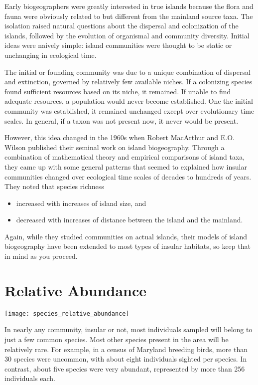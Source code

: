 \documentclass[letterpaper]{tufte-handout}
\begin{document}
Early biogeographers were greatly interested in true islands because the flora and fauna were obviously related to but different from the mainland source taxa. The isolation raised natural questions about the dispersal and colonization of the islands, followed by the evolution of organismal and community diversity. Initial ideas were naively simple: island communities were thought to be static or unchanging in ecological time.  

The initial or founding community was due to a unique combination of dispersal and extinction, governed by relatively few available niches. If a colonizing species found sufficient resources based on its niche, it remained.  If unable to find adequate resources, a population would never become established. One the initial community was established, it remained unchanged except over evolutionary time scales.  In general, if a taxon was not present now, it never would be present.  

However, this idea changed in the 1960s when Robert MacArthur and E.O. Wilson published their seminal work on island biogeography. Through a combination of mathematical theory and empirical comparisons of island taxa, they came up with some general patterns that seemed to explained how insular communities changed over ecological time scales of decades to hundreds of years. They noted that species richness 
\begin{itemize}
	\item increased with increases of island size, and
	\item decreased with increases of distance between the island and the mainland.
\end{itemize}
Again, while they studied communities on actual islands, their models of island biogeography have been extended to most types of insular habitats, so keep that in mind as you proceed.

\section{Relative Abundance}\label{sec:relative_abundance}

\begin{marginfigure}%
	\centering
	\texttt{[image: species\_relative\_abundance]}
\end{marginfigure} 
In nearly any community, insular or not, most individuals sampled will belong to just a few common species.  Most other species present in the area will be relatively rare. For example, in a census of Maryland breeding birds, more than 30 species were uncommon, with about eight individuals sighted per species. In contrast, about five species were very abundant, represented by more than 256 individuals each.
\end{document}
